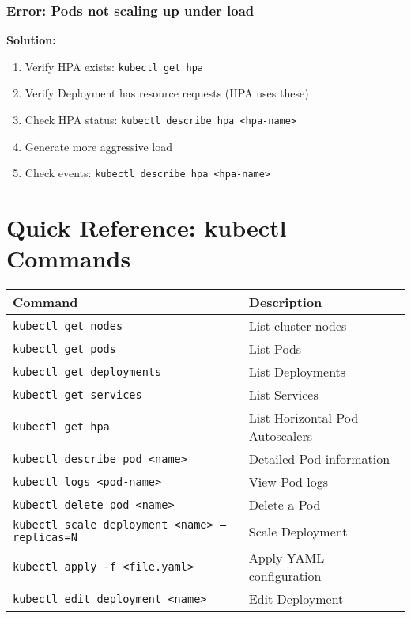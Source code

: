 \documentclass[12pt,a4paper]{article}
\begin{document}
\subsubsection{Error: Pods not scaling up under load}

\begin{warningbox}
\textbf{Solution:}
\begin{enumerate}
    \item Verify HPA exists: \texttt{kubectl get hpa}
    \item Verify Deployment has resource requests (HPA uses these)
    \item Check HPA status: \texttt{kubectl describe hpa <hpa-name>}
    \item Generate more aggressive load
    \item Check events: \texttt{kubectl describe hpa <hpa-name>}
\end{enumerate}
\end{warningbox}

\section{Quick Reference: kubectl Commands}

\begin{table}[H]
\centering
\small
\begin{tabularx}{\textwidth}{|l|X|}
\toprule
\textbf{Command} & \textbf{Description} \\
\midrule
\texttt{kubectl get nodes} & List cluster nodes \\
\texttt{kubectl get pods} & List Pods \\
\texttt{kubectl get deployments} & List Deployments \\
\texttt{kubectl get services} & List Services \\
\texttt{kubectl get hpa} & List Horizontal Pod Autoscalers \\
\texttt{kubectl describe pod <name>} & Detailed Pod information \\
\texttt{kubectl logs <pod-name>} & View Pod logs \\
\texttt{kubectl delete pod <name>} & Delete a Pod \\
\texttt{kubectl scale deployment <name> --replicas=N} & Scale Deployment \\
\texttt{kubectl apply -f <file.yaml>} & Apply YAML configuration \\
\texttt{kubectl edit deployment <name>} & Edit Deployment \\
\bottomrule
\end{tabularx}
\end{table}
\end{document}
